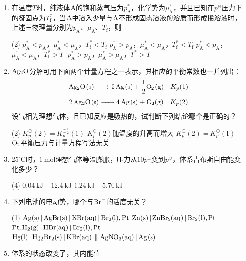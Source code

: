 \begin{enumerate}[label=\arabic*., itemsep=1.5ex]
    \item 在温度$T$时，纯液体$\ce{A}$的饱和蒸气压为$p_\mathrm{A}^*$，化学势为$\mu_\mathrm{A}^*$，并且已知在$p^\ominus$压力下的凝固点为$T_\mathrm{f}^*$，当$\ce{A}$中溶入少量与$\ce{A}$不形成固态溶液的溶质而形成稀溶液时，上述三物理量分别为$p_\mathrm{A}$、$\mu_\mathrm{A}$、$T_\mathrm{f}$，则
    \begin{tasks}(2)
        \task $p_\mathrm{A}^* < p_\mathrm{A}$，$\mu_\mathrm{A}^* < \mu_\mathrm{A}$，$T_\mathrm{f}^* < T_\mathrm{f}$
        \task $p_\mathrm{A}^* > p_\mathrm{A}$，$\mu_\mathrm{A}^* < \mu_\mathrm{A}$，$T_\mathrm{f}^* < T_\mathrm{f}$
        \task $p_\mathrm{A}^* < p_\mathrm{A}$，$\mu_\mathrm{A}^* < \mu_\mathrm{A}$，$T_\mathrm{f}^* > T_\mathrm{f}$
        \task $p_\mathrm{A}^* > p_\mathrm{A}$，$\mu_\mathrm{A}^* > \mu_\mathrm{A}$，$T_\mathrm{f}^* > T_\mathrm{f}$
    \end{tasks}
    \item $\ce{Ag2O}$分解可用下面两个计量方程之一表示，其相应的平衡常数也一并列出：
    \[
    \ce{Ag2O(s) -> 2Ag(s) + \frac{1}{2}O2(g)} \quad K_p(1)
    \]
    \[
    \ce{2Ag2O(s) -> 4Ag(s) + O2(g)} \quad K_p(2)
    \]
    设气相为理想气体，且已知反应是吸热的，试判断下列结论哪个是正确的？
    \begin{tasks}(2)
        \task $K_p^\ominus(2)=K_p^{\ominus\frac{1}{2}}(1)$
        \task $K_p^\ominus(2)$随温度的升高而增大
        \task $K_p^\ominus(2)=K_p^\ominus(1)$
        \task $\ce{O2}$平衡压力与计量方程写法无关
    \end{tasks}
    \item $25^\circ\mathrm{C}$时，$1\ \mathrm{mol}$理想气体等温膨胀，压力从$10p^\ominus$变到$p^\ominus$，体系吉布斯自由能变化多少？
    \begin{tasks}(4)
        \task $0.04\ \mathrm{kJ}$
        \task $-12.4\ \mathrm{kJ}$
        \task $1.24\ \mathrm{kJ}$
        \task $-5.70\ \mathrm{kJ}$
    \end{tasks}
    \item 下列电池的电动势，哪个与$\ce{Br^-}$的活度无关？
    \begin{tasks}(1)
        \task $\ce{Ag(s) | AgBr(s) | KBr(aq) | Br2(l), Pt}$
        \task $\ce{Zn(s) | ZnBr2(aq) | Br2(l), Pt}$
        \task $\ce{Pt, H2(g) | HBr(aq) | Br2(l), Pt}$
        \task $\ce{Hg(l) | Hg2Br2(s) | KBr(aq) \parallel AgNO3(aq) | Ag(s)}$
    \end{tasks}
    \item 体系的状态改变了，其内能值

\end{enumerate}
